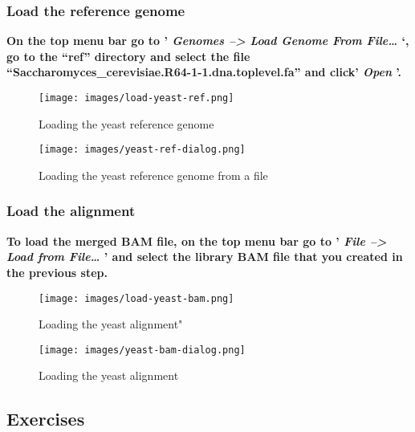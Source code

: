 \documentclass[11pt]{article}
\begin{document}
    \hypertarget{load-the-reference-genome}{%
\subsubsection{Load the reference
genome}\label{load-the-reference-genome}}

\textbf{On the top menu bar go to ' \textit{Genomes --\textgreater{} Load
Genome From File\ldots{}} `, go to the ``ref'' directory and select the
file ``Saccharomyces\_cerevisiae.R64-1-1.dna.toplevel.fa'' and click'
\textit{Open} '.}

    \begin{figure}
\centering
\texttt{[image: images/load-yeast-ref.png]}
\caption{Loading the yeast reference genome}
\end{figure}

    \begin{figure}
\centering
\texttt{[image: images/yeast-ref-dialog.png]}
\caption{Loading the yeast reference genome from a file}
\end{figure}

    \hypertarget{load-the-alignment}{%
\subsubsection{Load the alignment}\label{load-the-alignment}}

\textbf{To load the merged BAM file, on the top menu bar go to '
\textit{File --\textgreater{} Load from File\ldots{}} ' and select the
library BAM file that you created in the previous step.}

    \begin{figure}
\centering
\texttt{[image: images/load-yeast-bam.png]}
\caption{Loading the yeast alignment"}
\end{figure}

    \begin{figure}
\centering
\texttt{[image: images/yeast-bam-dialog.png]}
\caption{Loading the yeast alignment}
\end{figure}

    \hypertarget{exercises}{%
\subsection{Exercises}\label{exercises}}
\end{document}
